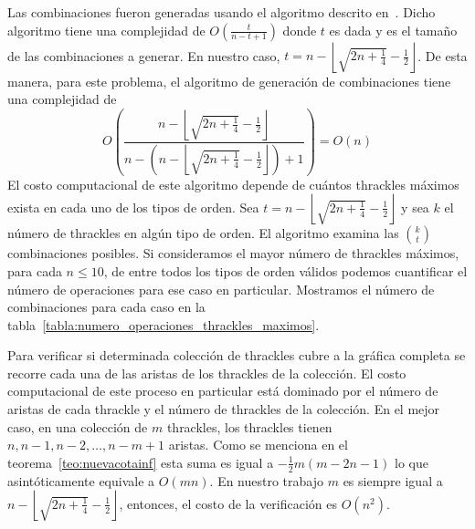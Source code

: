   Las combinaciones fueron generadas usando el algoritmo descrito en~\cite{Knuth2011A}. Dicho
  algoritmo tiene una complejidad de $\displaystyle O\left(\frac{t}{n-t+1}\right)$
  donde $t$ es dada y es el tamaño de las combinaciones a generar.
  En nuestro caso, $t=n - \left\lfloor\sqrt{2n + \frac{1}{4}} - \frac{1}{2}\right\rfloor$. De esta
  manera, para este problema, el algoritmo de generación de combinaciones tiene una complejidad de
  \[O\left(\frac{n - \left\lfloor\sqrt{2n + \frac{1}{4}} - \frac{1}{2}\right\rfloor}
  {n - \left(n - \left\lfloor\sqrt{2n + \frac{1}{4}} - \frac{1}{2}\right\rfloor\right)+1}\right) =
  O(n)\]
  El costo computacional de este algoritmo depende de cuántos thrackles máximos exista en cada uno
  de los tipos de orden. Sea $t=  n -
  \left\lfloor\sqrt{2n + \frac{1}{4}} - \frac{1}{2}\right\rfloor$ y sea $k$ el número de thrackles
  en algún tipo de orden. El algoritmo examina las $\binom{k}{t}$ combinaciones posibles. Si
  consideramos el mayor número de thrackles máximos, para cada $ n \leq 10$, de entre todos
  los tipos de orden válidos podemos cuantificar el número de operaciones para ese caso en
  particular. Mostramos el número de combinaciones para cada caso en la
  tabla~\ref{tabla:numero_operaciones_thrackles_maximos}.

  Para verificar si determinada colección de thrackles cubre a la gráfica completa se recorre cada
  una de las aristas de los thrackles de la colección. El costo computacional de este proceso en
  particular está dominado por el número de aristas de cada thrackle y el número de thrackles de la
  colección. En el mejor caso, en una colección de $m$ thrackles, los thrackles tienen
  $n,n-1,n-2,\dots,n-m+1$ aristas. Como se menciona en el teorema~\ref{teo:nuevacotainf} esta suma
  es igual a $-\frac{1}{2}m(m-2n-1)$ lo que asintóticamente equivale a $O(mn)$. En nuestro trabajo
  $m$ es siempre igual a $n -  \left\lfloor\sqrt{2n + \frac{1}{4}} - \frac{1}{2}\right\rfloor$,
  entonces, el costo de la verificación es $O(n^2)$.

